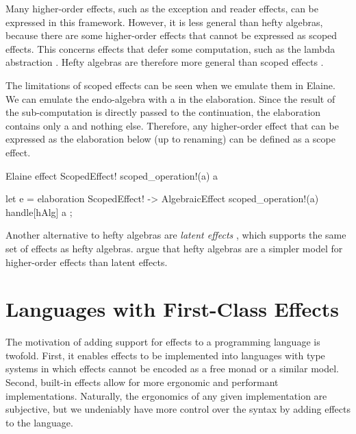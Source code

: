 Many higher-order effects, such as the exception and reader effects, can be expressed in this framework. However, it is less general than hefty algebras, because there are some higher-order effects that cannot be expressed as scoped effects. This concerns effects that defer some computation, such as the lambda abstraction \autocite{oh_latent_2021}. Hefty algebras are therefore more general than scoped effects \autocite{bach_poulsen_hefty_2023}.

The limitations of scoped effects can be seen when we emulate them in Elaine. We can emulate the endo-algebra with a  in the elaboration. Since the result of the sub-computation is directly passed to the continuation, the elaboration contains only a  and nothing else. Therefore, any higher-order effect that can be expressed as the elaboration below (up to renaming) can be defined as a scope effect.

\begin{lst}{Elaine}
effect ScopedEffect! {
    scoped_operation!(a) a
}

let e = elaboration ScopedEffect! -> AlgebraicEffect {
    scoped_operation!(a) {
        handle[hAlg] a
    }
};
\end{lst}

\noindent Another alternative to hefty algebras are \emph{latent effects} \autocite{oh_latent_2021}, which supports the same set of effects as hefty algebras. \textcite{bach_poulsen_hefty_2023} argue that hefty algebras are a simpler model for higher-order effects than latent effects.

\section{Languages with First-Class Effects}

The motivation of adding support for effects to a programming language is twofold. First, it enables effects to be implemented into languages with type systems in which effects cannot be encoded as a free monad or a similar model. Second, built-in effects allow for more ergonomic and performant implementations. Naturally, the ergonomics of any given implementation are subjective, but we undeniably have more control over the syntax by adding effects to the language.

